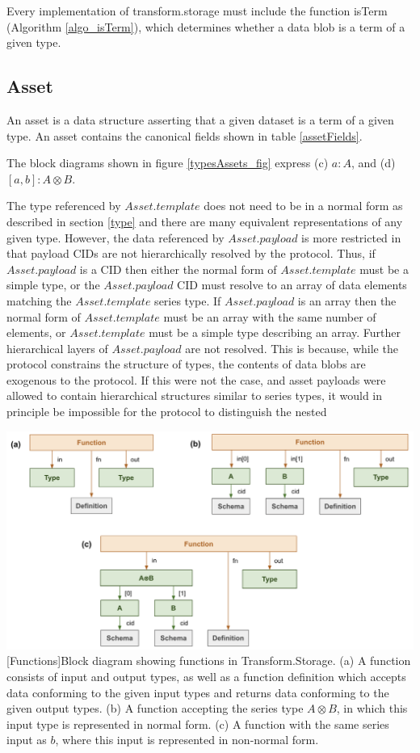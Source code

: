 \documentclass[9pt, oneside]{article}   	%
\begin{document}
\begin{multicols}{2}
Every implementation of transform.storage must include the function isTerm (Algorithm \ref{algo_isTerm}), which determines whether a data blob is a term of a given type.

\subsection{Asset}\label{asset}

An asset is a data structure asserting that a given dataset is a term of a given type. An asset contains the canonical fields shown in table \ref{assetFields}.

The block diagrams shown in figure \ref{typesAssets_fig} express (c) $a : A$, and (d) $[a, b] : A \otimes B$. 

The type referenced by $Asset.template$ does not need to be in a normal form as described in section \ref{type} and there are many equivalent representations of any given type. However, the data referenced by $Asset.payload$ is more restricted in that payload CIDs are not hierarchically resolved by the protocol. Thus, if $Asset.payload$ is a CID then either the normal form of $Asset.template$ must be a simple type, or the $Asset.payload$ CID must resolve to an array of data elements matching the $Asset.template$ series type. If $Asset.payload$ is an array then the normal form of $Asset.template$ must be an array with the same number of elements, or $Asset.template$ must be a simple type describing an array. Further hierarchical layers of $Asset.payload$ are not resolved. This is because, while the protocol constrains the structure of types, the contents of data blobs are exogenous to the protocol. If this were not the case, and asset payloads were allowed to contain hierarchical structures similar to series types, it would in principle be impossible for the protocol to distinguish the nested 

\end{multicols}
\begin{center}
\includegraphics[width=1\columnwidth]{fig_functions}
[Functions]{Block diagram showing functions in Transform.Storage. (a) A function consists of input and output types, as well as a function definition which accepts data conforming to the given input types and returns data conforming to the given output types. (b) A function accepting the series type $A \otimes B$, in which this input type is represented in normal form. (c) A function with the same series input as $b$, where this input is represented in non-normal form.}
\label{functions_fig}
\end{center}
\end{document}
